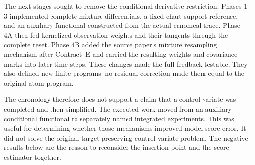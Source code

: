 The next stages sought to remove the conditional-derivative restriction.
Phases 1--3 implemented complete mixture differentials, a fixed-chart support
reference, and an auxiliary functional constructed from the actual canonical
trace. Phase 4A then fed kernelized observation weights and their tangents
through the complete reset. Phase 4B added the source paper's mixture
resampling mechanism after Contract--E and carried the resulting weights and
covariance marks into later time steps. These changes made the full feedback
testable. They also defined new finite programs; no residual correction made
them equal to the original atom program.

The chronology therefore does not support a claim that a control variate was
completed and then simplified. The executed work moved from an auxiliary
conditional functional to separately named integrated experiments. This was
useful for determining whether those mechanisms improved model-score error.
It did not solve the original target-preserving control-variate problem.
The negative results below are the reason to reconsider the insertion point
and the score estimator together.
